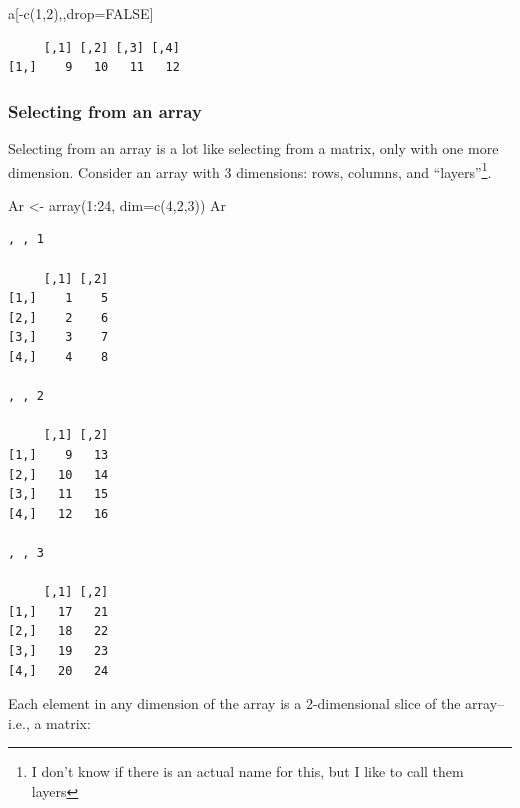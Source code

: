 \documentclass[
  13,
  letterpaper,
]{report}
\newenvironment{Shaded}{\begin{snugshade}}{\end{snugshade}}
\newcommand{\AttributeTok}[1]{\textcolor[rgb]{0.40,0.45,0.13}{#1}}
\newcommand{\ConstantTok}[1]{\textcolor[rgb]{0.56,0.35,0.01}{#1}}
\newcommand{\DecValTok}[1]{\textcolor[rgb]{0.68,0.00,0.00}{#1}}
\newcommand{\FunctionTok}[1]{\textcolor[rgb]{0.28,0.35,0.67}{#1}}
\newcommand{\NormalTok}[1]{\textcolor[rgb]{0.00,0.23,0.31}{#1}}
\newcommand{\OtherTok}[1]{\textcolor[rgb]{0.00,0.23,0.31}{#1}}
\newcommand{\SpecialCharTok}[1]{\textcolor[rgb]{0.37,0.37,0.37}{#1}}
\begin{document}
\begin{Shaded}
\begin{Highlighting}[]
\NormalTok{a[}\SpecialCharTok{{-}}\FunctionTok{c}\NormalTok{(}\DecValTok{1}\NormalTok{,}\DecValTok{2}\NormalTok{),,drop}\OtherTok{=}\ConstantTok{FALSE}\NormalTok{]}
\end{Highlighting}
\end{Shaded}

\begin{verbatim}
     [,1] [,2] [,3] [,4]
[1,]    9   10   11   12
\end{verbatim}

\subsubsection{Selecting from an array}\label{sec-05-select-bas-arr}

Selecting from an array is a lot like selecting from a matrix, only with
one more dimension. Consider an array with 3 dimensions: rows, columns,
and ``layers''\footnote{I don't know if there is an actual name for
  this, but I like to call them layers}.

\begin{Shaded}
\begin{Highlighting}[]
\NormalTok{Ar }\OtherTok{\textless{}{-}} \FunctionTok{array}\NormalTok{(}\DecValTok{1}\SpecialCharTok{:}\DecValTok{24}\NormalTok{, }\AttributeTok{dim=}\FunctionTok{c}\NormalTok{(}\DecValTok{4}\NormalTok{,}\DecValTok{2}\NormalTok{,}\DecValTok{3}\NormalTok{))}
\NormalTok{Ar}
\end{Highlighting}
\end{Shaded}

\begin{verbatim}
, , 1

     [,1] [,2]
[1,]    1    5
[2,]    2    6
[3,]    3    7
[4,]    4    8

, , 2

     [,1] [,2]
[1,]    9   13
[2,]   10   14
[3,]   11   15
[4,]   12   16

, , 3

     [,1] [,2]
[1,]   17   21
[2,]   18   22
[3,]   19   23
[4,]   20   24
\end{verbatim}

Each element in any dimension of the array is a 2-dimensional slice of
the array--i.e., a matrix:
\end{document}
